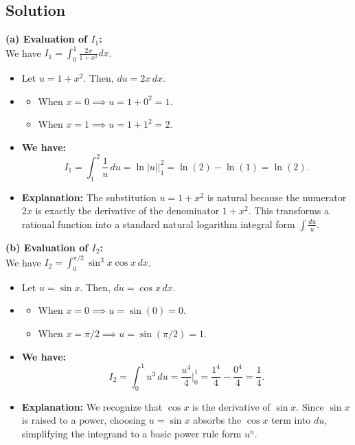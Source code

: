 \subsection*{Solution}
\textbf{(a) Evaluation of $I_1$:} \\
    We have $I_1 = \int_{0}^{1} \frac{2x}{1+x^2} dx$.
    \begin{itemize}
        \item Let $u = 1 + x^2$. Then, $du = 2x \, dx$.
        \item
        \begin{itemize}
            \item When $x = 0 \implies u = 1 + 0^2 = 1$.
            \item When $x = 1 \implies u = 1 + 1^2 = 2$.
        \end{itemize} 
        \item \textbf{We have:}
        \[
        I_1 = \int_{1}^{2} \frac{1}{u} \, du = \ln|u| \Big|_{1}^{2} = \ln(2) - \ln(1) = \ln(2).
        \]
        \item \textbf{Explanation:} The substitution $u = 1 + x^2$ is natural because the numerator $2x$ is exactly the derivative of the denominator $1 + x^2$. This transforms a rational function into a standard natural logarithm integral form $\int \frac{du}{u}$.
    \end{itemize}

\textbf{(b) Evaluation of $I_2$:} \\
    We have $I_2 = \int_{0}^{\pi/2} \sin^3 x \cos x \, dx$.
    \begin{itemize}
        \item Let $u = \sin x$. Then, $du = \cos x \, dx$.
        \item
        \begin{itemize}
            \item When $x = 0 \implies u = \sin(0) = 0$.
            \item When $x = \pi/2 \implies u = \sin(\pi/2) = 1$.
        \end{itemize}
        \item \textbf{We have:}
        \[
        I_2 = \int_{0}^{1} u^3 \, du = \frac{u^4}{4} \Big|_{0}^{1} = \frac{1^4}{4} - \frac{0^4}{4} = \frac{1}{4}.
        \]
        \item \textbf{Explanation:} We recognize that $\cos x$ is the derivative of $\sin x$. Since $\sin x$ is raised to a power, choosing $u = \sin x$ absorbs the $\cos x$ term into $du$, simplifying the integrand to a basic power rule form $u^n$.
    \end{itemize}

